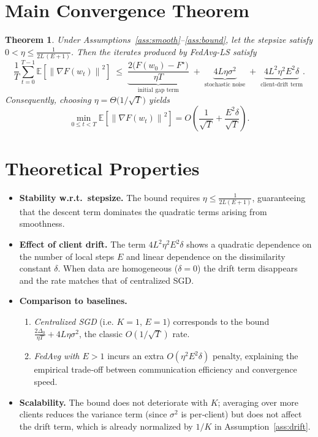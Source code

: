 \documentclass{article}
\newtheorem{theorem}{Theorem}
\newcommand{\E}{\mathbb{E}}
\newcommand{\norm}[1]{\left\|#1\right\|}
\begin{document}
\section*{Main Convergence Theorem}
\begin{theorem}\label{thm:main}
Under Assumptions~\ref{ass:smooth}–\ref{ass:bound},
let the stepsize satisfy $0<\eta\le \frac{1}{2L\,(E+1)}$.
Then the iterates produced by FedAvg-LS satisfy
\[
\frac{1}{T}\sum_{t=0}^{T-1}\E\!\left[\norm{\nabla F(w_t)}^2\right]
\;\le\;
\underbrace{\frac{2\bigl(F(w_0)-F^\star\bigr)}{\eta T}}_{\text{initial gap term}}
\;+\;
\underbrace{4L\eta\sigma^2}_{\text{stochastic noise}}
\;+\;
\underbrace{4L^2\eta^2E^2\delta}_{\text{client‑drift term}} .
\]
Consequently, choosing $\eta = \Theta\!\bigl(1/\sqrt{T}\bigr)$ yields
\[
\min_{0\le t<T}\E\!\left[\norm{\nabla F(w_t)}^2\right]
 = O\!\left(\frac{1}{\sqrt{T}}+ \frac{E^2\delta}{\sqrt{T}}\right).
\]
\end{theorem}

\section*{Theoretical Properties}
\begin{itemize}
\item \textbf{Stability w.r.t.\ stepsize.} The bound requires
$\eta\le\frac{1}{2L(E+1)}$, guaranteeing that the descent term dominates the
quadratic terms arising from smoothness.
\item \textbf{Effect of client drift.} The term $4L^2\eta^2E^2\delta$ shows a
quadratic dependence on the number of local steps $E$ and linear dependence on
the dissimilarity constant $\delta$.  When data are homogeneous ($\delta=0$) the
drift term disappears and the rate matches that of centralized SGD.
\item \textbf{Comparison to baselines.}
\begin{enumerate}
\item \emph{Centralized SGD} (i.e. $K=1$, $E=1$) corresponds to the bound
$\frac{2\Delta_0}{\eta T}+4L\eta\sigma^2$, the classic $O(1/\sqrt{T})$ rate.
\item \emph{FedAvg with $E>1$} incurs an extra $O(\eta^2E^2\delta)$ penalty,
explaining the empirical trade‑off between communication efficiency and
convergence speed.
\end{enumerate}
\item \textbf{Scalability.} The bound does not deteriorate with $K$; averaging
over more clients reduces the variance term (since $\sigma^2$ is per‑client)
but does not affect the drift term, which is already normalized by $1/K$ in
Assumption~\ref{ass:drift}.
\end{itemize}
\end{document}
